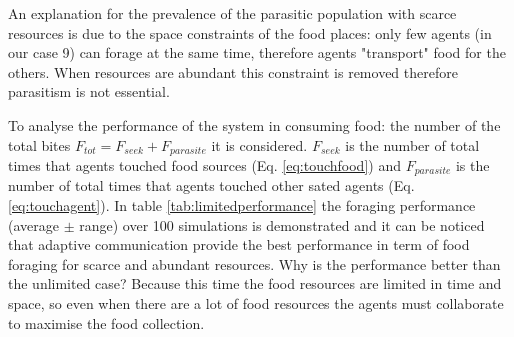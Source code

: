 \begin{figure}
\centerline{
\hfil
{}}
\caption[Self organisation with honest behaviour and limited resources]{\label{fig:limitedcomparison}}
\label{fig_sim}
\end{figure}
An explanation for the prevalence of the parasitic population with scarce
resources is due to the space constraints of the food places: only few agents
 (in our case 9) can forage at the same time, therefore agents "transport"
food for the others. When resources are abundant this constraint is
removed therefore parasitism is not essential.

To analyse the performance of the system in consuming food: the number of the total
bites $F_{tot}=F_{seek}+F_{parasite}$ it is considered.
$F_{seek}$ is the number of total times that agents touched food sources
(Eq. \ref{eq:touchfood}) and $F_{parasite}$ is the number of total times that
agents touched other sated agents (Eq. \ref{eq:touchagent}).
In table \ref{tab:limitedperformance} the foraging performance
(average $\pm$ range) over 100 simulations is demonstrated and it can be noticed that adaptive
communication provide the best performance in term of food foraging for scarce
and abundant resources. Why is the performance better than the unlimited case?
Because this time the food resources are limited in time and space, so even when
 there are a lot of food resources the agents must collaborate to maximise
the food collection.

